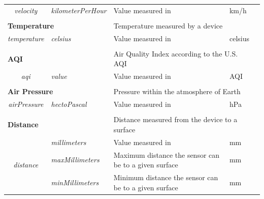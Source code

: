 \begin{landscape}
\begin{longtable}{cllll}
   \textit{velocity}                     & \textit{kilometerPerHour}          & Value measured in                                      & km/h                           &  \\ [0.4em] \cline{1-4}
   \\[-0.85em]
   \multicolumn{2}{l}{\textbf{Temperature}}                                   & \multicolumn{2}{l}{Temperature measured by a device}                                    &  \\
   \textit{temperature}                  & \textit{celsius}                   & Value measured in                                      & celsius                        &  \\ [0.4em] \cline{1-4}
   \\[-0.85em]
   \multicolumn{2}{l}{\textbf{AQI}}                                           & \multicolumn{2}{l}{Air Quality Index according to the U.S. AQI}                         &  \\
   \textit{aqi}                          & \textit{value}                     & Value measured in                                      & AQI                            &  \\ [0.4em] \cline{1-4}
   \\[-0.85em]
   \multicolumn{2}{l}{\textbf{Air Pressure}}                                  & \multicolumn{2}{l}{Pressure within the atmosphere of Earth}                             &  \\
   \textit{airPressure}                  & \textit{hectoPascal}               & Value measured in                                      & hPa                            &  \\ [0.4em] \cline{1-4}
   \\[-0.85em]
   \multicolumn{2}{l}{\textbf{Distance}}                                      & \multicolumn{2}{l}{Distance measured from the device to a surface}                      &  \\
   \multirow{3}{*}{\textit{distance}}    & \textit{millimeters}               & Value measured in                                      & mm                             &  \\
                                         & \textit{maxMillimeters}            & Maximum distance the sensor can be to a given surface  & mm                             &  \\
                                         & \textit{minMillimeters}            & Minimum distance the sensor can be to a given surface  & mm                             &  \\ [0.4em] \cline{1-4}

\end{longtable}
\end{landscape}
